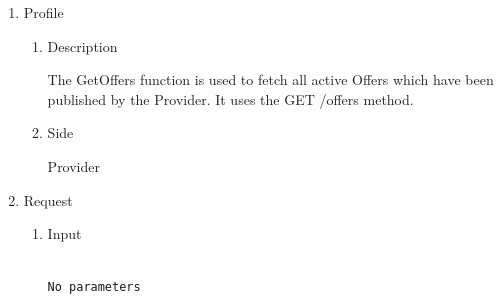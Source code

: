 \begin{enumerate}

\item Profile

\begin{enumerate}

\item Description

The GetOffers function is used to fetch all active Offers which have been published by the Provider. 
It uses the GET /offers method.

\item Side

Provider

\end{enumerate}

\item Request

\begin{enumerate}

\item Input

\begin{tcolorbox}[boxrule=0pt, frame empty]
\begin{verbatim}

No parameters

\end{verbatim}
\end{tcolorbox}










\end{enumerate}
\end{enumerate}
